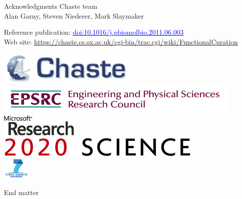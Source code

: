 \documentclass[t,xcolor={usenames,dvipsnames}]{beamer}
\newcommand{\myhref}[2]{\href{#1}{\textcolor{Blue}{#2}}}
\newcommand{\doi}[1]{\myhref{http://dx.doi.org/#1}{doi:#1}}
\begin{document}
\begin{frame}{Acknowledgments}
Chaste team\\
Alan Garny, Steven Niederer, Mark Slaymaker

Reference publication: \doi{10.1016/j.pbiomolbio.2011.06.003}\\
Web site: \url{https://chaste.cs.ox.ac.uk/cgi-bin/trac.cgi/wiki/FunctionalCuration}

\begin{center}
\includegraphics[scale=.9]{chaste-266x60}\\ \vspace{.4cm}
\includegraphics[height=.42cm]{EPSRC1RGBLO} \hspace{.05cm}
\includegraphics[height=.42cm]{logo_msr} \hspace{.05cm}
\includegraphics[height=.42cm]{logo2020science}\\ \vspace{.2cm}
\includegraphics[height=1.1cm]{FP7-gen-rgb}
\end{center}
\end{frame}


\begin{frame}{End matter}
\end{frame}
\end{document}
